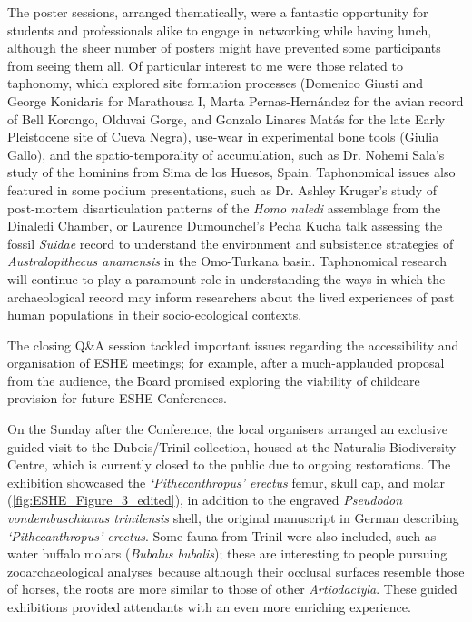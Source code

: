 The poster sessions, arranged thematically, were a fantastic opportunity for students and professionals alike to engage in networking while having lunch, although the sheer number of posters might have prevented some participants from seeing them all. Of particular interest to me were those related to taphonomy, which explored site formation processes (Domenico Giusti and George Konidaris for Marathousa I, Marta Pernas-Hernández for the avian record of Bell Korongo, Olduvai Gorge, and Gonzalo Linares Matás for the late Early Pleistocene site of Cueva Negra), use-wear in experimental bone tools (Giulia Gallo), and the spatio-temporality of accumulation, such as Dr. Nohemi Sala’s study of the hominins from Sima de los Huesos, Spain. Taphonomical issues also featured in some podium presentations, such as Dr. Ashley Kruger’s study of post-mortem disarticulation patterns of the \emph{Homo naledi} assemblage from the Dinaledi Chamber, or Laurence Dumounchel’s Pecha Kucha talk assessing the fossil \emph{Suidae} record to understand the environment and subsistence strategies of \emph{Australopithecus anamensis} in the Omo-Turkana basin. Taphonomical research will continue to play a paramount role in understanding the ways in which the archaeological record may inform researchers about the lived experiences of past human populations in their socio-ecological contexts.

The closing Q\&A session tackled important issues regarding the accessibility and organisation of ESHE meetings; for example, after a much-applauded proposal from the audience, the Board promised exploring the viability of childcare provision for future ESHE Conferences.

On the Sunday after the Conference, the local organisers arranged an exclusive guided visit to the Dubois/Trinil collection, housed at the Naturalis Biodiversity Centre, which is currently closed to the public due to ongoing restorations. The exhibition showcased the \emph{‘Pithecanthropus’ erectus} femur, skull cap, and molar (\cref{fig:ESHE_Figure_3_edited}), in addition to the engraved \emph{Pseudodon vondembuschianus trinilensis} shell, the original manuscript in German describing \emph{‘Pithecanthropus’ erectus}. Some fauna from Trinil were also included, such as water buffalo molars (\emph{Bubalus bubalis}); these are interesting to people pursuing zooarchaeological analyses because although their occlusal surfaces resemble those of horses, the roots are more similar to those of other \emph{Artiodactyla}. These guided exhibitions provided attendants with an even more enriching experience.

